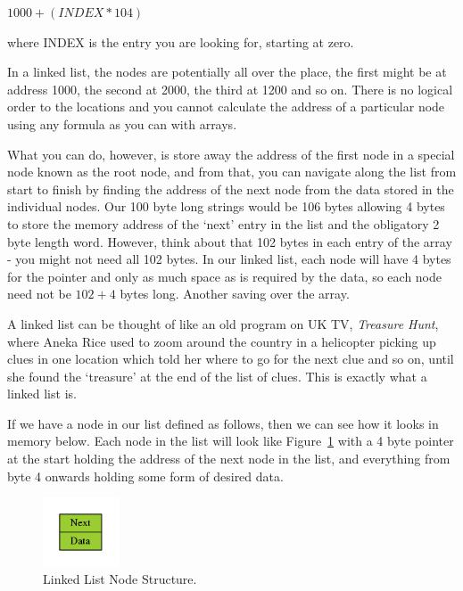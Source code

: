     $1000 + (INDEX * 104)$
    
    where INDEX is the entry you are looking for, starting at
    zero.

In a linked list, the nodes are potentially all over the place, the first might
    be at address 1000, the second at 2000, the third at 1200 and so on. There
    is no logical order to the locations and you cannot calculate the address
    of a particular node using any formula as you can with arrays.

What you can do, however, is store away the address of the first
    node in a special node known as the root node, and from that, you can
    navigate along the list from start to finish by finding the address of the
    next node from the data stored in the individual nodes. Our 100 byte long
    strings would be 106 bytes allowing 4 bytes to store the memory address of
    the `next' entry in the list and the obligatory 2 byte length word.
    However, think about that 102 bytes in each entry of the array -{} you might
    not need all 102 bytes. In our linked list, each node will have 4 bytes
    for the pointer and only as much space as is required by the data, so each
    node need not be $102 + 4$ bytes long. Another saving over the array.

A linked list can be thought of like an old program on UK TV,
    \emph{Treasure Hunt}, where Aneka Rice used to zoom around the country in a
    helicopter picking up clues in one location which told her where to go for
    the next clue and so on, until she found the `treasure' at the end of the
    list of clues. This is exactly what a linked list is.

If we have a node in our list defined as follows, then we can see
    how it looks in memory below. Each node in the list will look like Figure~\ref{fig:LinkedListNodeStructure} with a 4 byte pointer at the start holding the address of the next node in the list, and everything from byte 4 onwards holding some form of desired data.

\begin{figure}[h]
\center
\includegraphics[width=0.2\textwidth]{Content/images/LL_Single_node.png}
\caption{Linked List Node Structure.}
\label{fig:LinkedListNodeStructure}
\end{figure}

